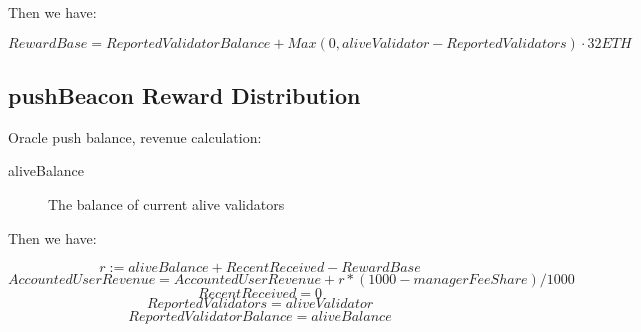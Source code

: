 \documentclass{article}
\begin{document}
Then we have:
\begin{theorem}[pushBeacon]
\label{pushBeacon}
\[RewardBase = ReportedValidatorBalance + Max(0, aliveValidator - ReportedValidators) \cdot  32 ETH\]
\end{theorem}

\subsection{pushBeacon Reward Distribution}
Oracle push balance, revenue calculation:
\begin{description}
\item[aliveBalance] The balance of current alive validators
\end{description}

Then we have:
\begin{theorem}[calcReward]
\label{calcReward}
\[r := aliveBalance + RecentReceived - RewardBase\]
\[AccountedUserRevenue = AccountedUserRevenue + r * (1000 - managerFeeShare) / 1000\]
\[RecentReceived = 0\]
\[ReportedValidators = aliveValidator\]
\[ReportedValidatorBalance = aliveBalance\]
\end{theorem}
\end{document}
